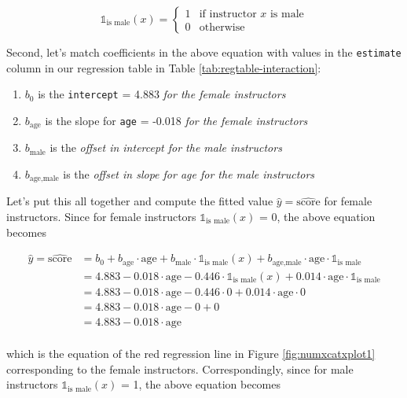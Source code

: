 \documentclass[12pt, krantz2,]{krantz}
\providecommand{\tightlist}{%
  \setlength{\itemsep}{0pt}\setlength{\parskip}{0pt}}
\begin{document}
\[
\mathbb{1}_{\mbox{is male}}(x) = \left\{
\begin{array}{ll}
1 & \text{if } \text{instructor } x \text{ is male} \\
0 & \text{otherwise}\end{array}
\right.
\]

Second, let's match coefficients in the above equation with values in the \texttt{estimate} column in our regression table in Table \ref{tab:regtable-interaction}:

\begin{enumerate}
\def\labelenumi{\arabic{enumi}.}
\tightlist
\item
  \(b_0\) is the \texttt{intercept} = 4.883 \emph{for the female instructors}
\item
  \(b_{\mbox{age}}\) is the slope for \texttt{age} = -0.018 \emph{for the female instructors}
\item
  \(b_{\mbox{male}}\) is the \emph{offset in intercept for the male instructors}
\item
  \(b_{\mbox{age,male}}\) is the \emph{offset in slope for age for the male instructors}
\end{enumerate}

Let's put this all together and compute the fitted value \(\widehat{y} = \widehat{\text{score}}\) for female instructors. Since for female instructors \(\mathbb{1}_{\mbox{is male}}(x)\) = 0, the above equation becomes

\[
\begin{aligned}
\widehat{y} = \widehat{\text{score}} &= b_0 + b_{\mbox{age}} \cdot \mbox{age} + b_{\mbox{male}} \cdot \mathbb{1}_{\mbox{is male}}(x) + b_{\mbox{age,male}} \cdot \mbox{age} \cdot \mathbb{1}_{\mbox{is male}}\\
&= 4.883 - 0.018    \cdot \mbox{age} - 0.446 \cdot \mathbb{1}_{\mbox{is male}}(x) + 0.014 \cdot \mbox{age} \cdot \mathbb{1}_{\mbox{is male}}\\
&= 4.883 - 0.018    \cdot \mbox{age} - 0.446 \cdot 0 + 0.014 \cdot \mbox{age} \cdot 0\\
&= 4.883 - 0.018    \cdot \mbox{age} - 0 + 0\\
&= 4.883 - 0.018    \cdot \mbox{age}\\
\end{aligned}
\]

which is the equation of the red regression line in Figure \ref{fig:numxcatxplot1} corresponding to the female instructors. Correspondingly, since for male instructors \(\mathbb{1}_{\mbox{is male}}(x)\) = 1, the above equation becomes
\end{document}
